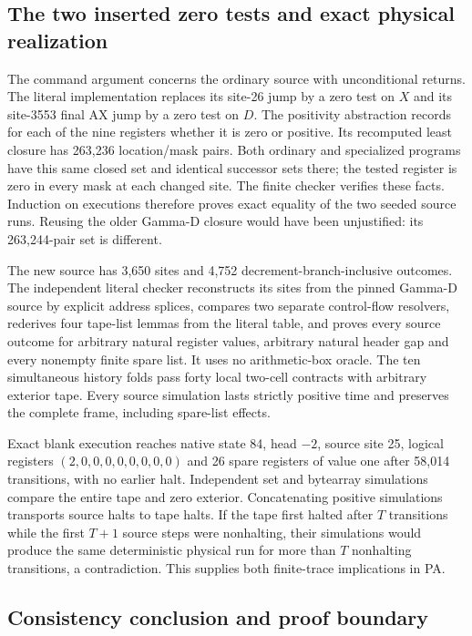 \subsection{The two inserted zero tests and exact physical realization}

The command argument concerns the ordinary source with unconditional
returns. The literal implementation replaces its site-26 jump by a
zero test on $X$ and its site-3553 final AX jump by a zero test on $D$.
The positivity abstraction records for each of the nine registers whether
it is zero or positive. Its recomputed least closure has 263,236
location/mask pairs. Both ordinary and specialized programs have this
same closed set and identical successor sets there; the tested register
is zero in every mask at each changed site. The finite checker verifies
these facts. Induction on executions therefore proves exact equality
of the two seeded source runs. Reusing the older Gamma-D closure would
have been unjustified: its 263,244-pair set is different.

The new source has 3,650 sites and 4,752 decrement-branch-inclusive
outcomes. The independent literal checker reconstructs its sites from
the pinned Gamma-D source by explicit address splices, compares two
separate control-flow resolvers, rederives four tape-list lemmas from the
literal table, and proves every source outcome for arbitrary natural
register values, arbitrary natural header gap and every nonempty finite
spare list. It uses no arithmetic-box oracle. The ten simultaneous
history folds pass forty local two-cell contracts with arbitrary exterior
tape. Every source simulation lasts strictly positive time and preserves
the complete frame, including spare-list effects.

Exact blank execution reaches native state 84, head $-2$, source site 25,
logical registers $(2,0,0,0,0,0,0,0,0)$ and 26 spare registers of value one
after 58,014 transitions, with no earlier halt. Independent set and
bytearray simulations compare the entire tape and zero exterior.
Concatenating positive simulations transports source halts to tape halts.
If the tape first halted after $T$ transitions while the first $T+1$
source steps were nonhalting, their simulations would produce the same
deterministic physical run for more than $T$ nonhalting transitions,
a contradiction. This supplies both finite-trace implications in PA.

\subsection{Consistency conclusion and proof boundary}

